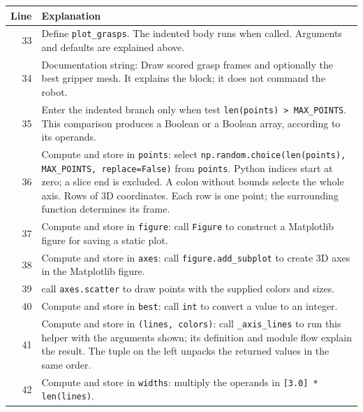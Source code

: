 \documentclass[11pt,a4paper]{book}
\begin{document}
\begin{longtable}{r p{}}

\textbf{Line} & \textbf{Explanation} \\ \hline \endhead

33 & Define \texttt{plot\_grasps}. The indented body runs when called. Arguments and defaults are explained above. \\

34 & Documentation string: Draw scored grasp frames and optionally the best gripper mesh. It explains the block; it does not command the robot. \\

35 & Enter the indented branch only when test \texttt{len(points) > MAX\_POINTS}. This comparison produces a Boolean or a Boolean array, according to its operands. \\

36 & Compute and store in \texttt{points}: select \texttt{np.random.choice(len(points), MAX\_POINTS, replace=False)} from \texttt{points}. Python indices start at zero; a slice end is excluded. A colon without bounds selects the whole axis. Rows of 3D coordinates. Each row is one point; the surrounding function determines its frame. \\

37 & Compute and store in \texttt{figure}: call \texttt{Figure} to construct a Matplotlib figure for saving a static plot.  \\

38 & Compute and store in \texttt{axes}: call \texttt{figure.add\_subplot} to create 3D axes in the Matplotlib figure.  \\

39 & call \texttt{axes.scatter} to draw points with the supplied colors and sizes. \\

40 & Compute and store in \texttt{best}: call \texttt{int} to convert a value to an integer.  \\

41 & Compute and store in \texttt{(lines, colors)}: call \texttt{\_axis\_lines} to run this helper with the arguments shown; its definition and module flow explain the result. The tuple on the left unpacks the returned values in the same order. \\

42 & Compute and store in \texttt{widths}: multiply the operands in \texttt{[3.0] * len(lines)}.  \\


\end{longtable}
\end{document}

